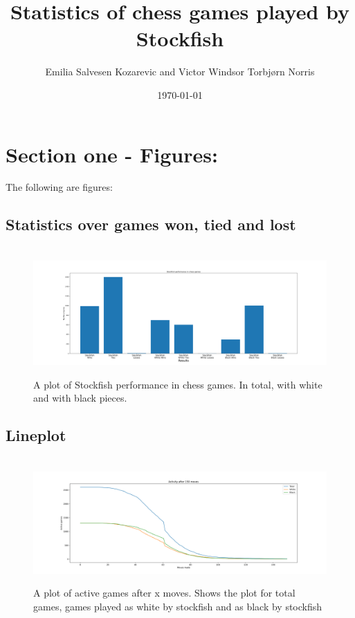 \documentclass{article}%
\title{Statistics of chess games played by Stockfish}%
\author{Emilia Salvesen Kozarevic and Victor Windsor Torbjørn Norris}%
\date{\today}%
\begin{document}
%
\normalsize%
\section{Section one {-} Figures:}%
\label{sec:Sectionone{-}Figures}%
The following are figures:%
\subsection{Statistics over games won, tied and lost}%
\label{subsec:Statisticsovergameswon,tiedandlost}%


\begin{figure}[h!]%
\ \hspace*{-5cm}%
\centering%
\includegraphics[width=1.8\textwidth]{stockFish.png}%
\caption{A plot of Stockfish performance in chess games. In total, with white and with black pieces.}%
\end{figure}

%
\subsection{Lineplot}%
\label{subsec:Lineplot}%


\begin{figure}[h!]%
\ \hspace*{-4cm}%
\centering%
\includegraphics[width=1.8\textwidth]{ActiveGamesLine.png}%
\caption{A plot of active games after x moves. Shows the plot for total games, games played as white by stockfish and as black by stockfish}%
\end{figure}
\end{document}
